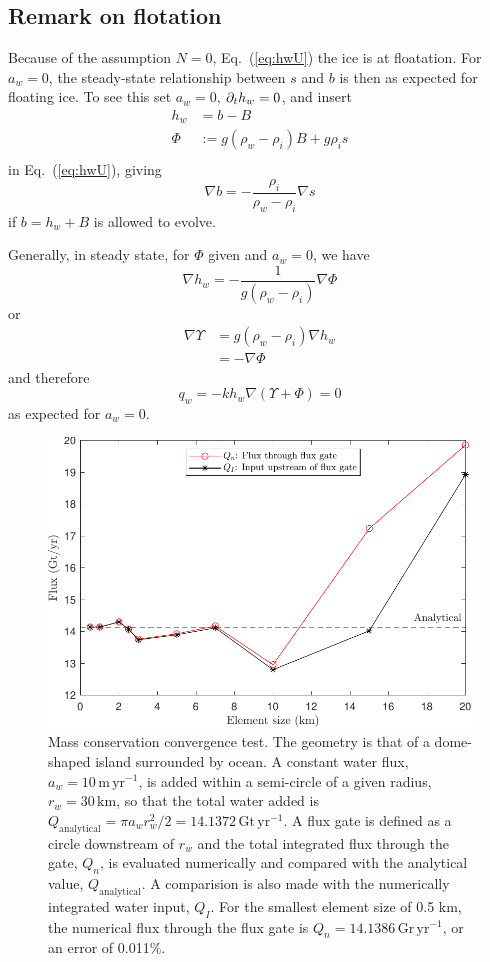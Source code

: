 \documentclass[10pt,a4paper]{article}
\begin{document}
\subsection{Remark on flotation}

Because of the assumption $N=0$, Eq.~(\ref{eq:hwU}) the ice is at
floatation. For $a_w=0$, the steady-state relationship between $s$ and
$b$ is then as expected for floating ice. To see this set $a_w=0$, $\partial_t
h_w=0$, and insert
\begin{align*}
h_w&=b-B \\
\Phi&:= g (\rho_w -\rho_i) B + g \rho_i s \\
\end{align*}
in Eq.~(\ref{eq:hwU}), giving
\[
 \nabla b =  -\frac{\rho_i}{\rho_w-\rho_i} \nabla s 
\]
if $b=h_w+B$ is allowed to evolve.


Generally, in steady state, for $\Phi$ given and $a_w=0$, we have
\begin{equation}
\nabla h_w  = -\frac{1}{g (\rho_w-\rho_i)} \nabla \Phi 
\label{eq:hwUss2}
\end{equation}
or
\begin{align*}
  \nabla \Upsilon &= g (\rho_w-\rho_i) \nabla h_w  \\
                  &= -\nabla \Phi
\end{align*}
and therefore
\[
q_w= -k h_w \nabla (\Upsilon + \Phi) =0
\]
as expected for $a_w=0$.


\begin{figure}
\centerline{\includegraphics[width=12cm]{IslandConvergenceTest.pdf}}
\caption[Convergence test]{Mass conservation convergence test. The
  geometry is that of a dome-shaped island surrounded by ocean. A
  constant water flux, $a_w=10\,\mathrm{m\,yr^{-1}}$, is added within a semi-circle of a given
  radius, $r_w=30\,\mathrm{km}$, so that the total water added is
  $Q_{\mathrm{analytical}}=\pi a_w
  r_w^2/2=14.1372\,\mathrm{Gt\,yr^{-1}}$. A flux gate is defined as a
  circle downstream of $r_w$ and the total integrated flux through the
  gate, $Q_n$, is evaluated numerically and compared with the
  analytical value, $Q_{\mathrm{analytical}}$. A comparision is also
  made with the numerically integrated water input, $Q_I$. For the
  smallest element size of 0.5 km, the numerical flux through the flux
  gate is $Q_n=14.1386\,\mathrm{Gr\,yr^{-1}}$, or an error of 0.011\%.
\label{fig:IslandCon}}
\end{figure}
\end{document}
